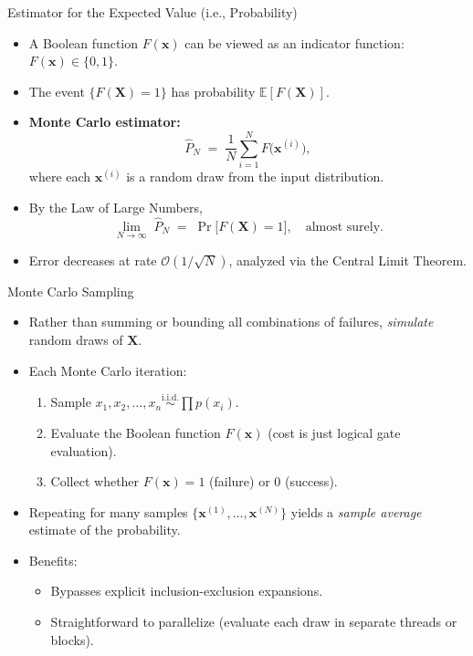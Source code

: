 \begin{frame}{Estimator for the Expected Value (i.e., Probability)}
\begin{itemize}
  \item A Boolean function \(F(\mathbf{x})\) can be viewed as an indicator function: \(F(\mathbf{x}) \in \{0,1\}\).
  \item The event \(\{F(\mathbf{X})=1\}\) has probability \(\mathbb{E}[F(\mathbf{X})]\).
  \item \textbf{Monte Carlo estimator:}
    \[
      \widehat{P}_N
      \;=\;
      \frac{1}{N}\sum_{i=1}^N 
      F\!\bigl(\mathbf{x}^{(i)}\bigr),
    \]
    where each \(\mathbf{x}^{(i)}\) is a random draw from the input distribution.
  \item By the Law of Large Numbers,
    \[
      \lim_{N \to \infty}\;\widehat{P}_N
      \;=\;
      \Pr\bigl[F(\mathbf{X})=1\bigr],
      \quad \text{almost surely}.
    \]
  \item Error decreases at rate \(\mathcal{O}(1/\sqrt{N})\), analyzed via the Central Limit Theorem.
\end{itemize}
\end{frame}

\begin{frame}{Monte Carlo Sampling}
\begin{itemize}
  \item Rather than summing or bounding all combinations of failures, \emph{simulate} random draws of \(\mathbf{X}\).
  \item Each Monte Carlo iteration:
    \begin{enumerate}
      \item Sample \(x_1, x_2,\dots,x_n \overset{\text{i.i.d.}}{\sim} \prod p(x_i)\).
      \item Evaluate the Boolean function \(F(\mathbf{x})\) (cost is just logical gate evaluation).
      \item Collect whether \(F(\mathbf{x})=1\) (failure) or 0 (success).
    \end{enumerate}
  \item Repeating for many samples \(\{\mathbf{x}^{(1)}, \dots, \mathbf{x}^{(N)}\}\) yields a \emph{sample average} estimate of the probability.
  \item Benefits:
    \begin{itemize}
      \item Bypasses explicit inclusion-exclusion expansions.
      \item Straightforward to parallelize (evaluate each draw in separate threads or blocks).
    \end{itemize}
\end{itemize}
\end{frame}


